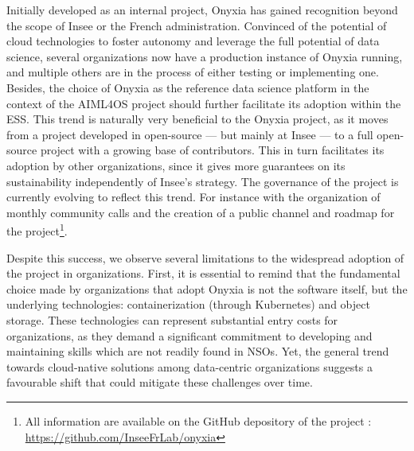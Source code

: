 \documentclass[graybox]{svmult}
\begin{document}
Initially developed as an internal project, Onyxia has gained recognition beyond the scope of Insee or the French administration. Convinced of the potential of cloud technologies to foster autonomy and leverage the full potential of data science, several organizations now have a production instance of Onyxia running, and multiple others are in the process of either testing or implementing one. Besides, the choice of Onyxia as the reference data science platform in the context of the AIML4OS project should further facilitate its adoption within the ESS. This trend is naturally very beneficial to the Onyxia project, as it moves from a project developed in open-source — but mainly at Insee — to a full open-source project with a growing base of contributors. This in turn facilitates its adoption by other organizations, since it gives more guarantees on its sustainability independently of Insee's strategy. The governance of the project is currently evolving to reflect this trend. For instance with the organization of monthly community calls and the creation of a public channel and roadmap for the project\footnote{All information are available on the GitHub depository of the project : \url{https://github.com/InseeFrLab/onyxia}}.

Despite this success, we observe several limitations to the widespread adoption of the project in organizations. First, it is essential to remind that the fundamental choice made by organizations that adopt Onyxia is not the software itself, but the underlying technologies: containerization (through Kubernetes) and object storage. These technologies can represent substantial entry costs for organizations, as they demand a significant commitment to developing and maintaining skills which are not readily found in NSOs. Yet, the general trend towards cloud-native solutions among data-centric organizations suggests a favourable shift that could mitigate these challenges over time.
\end{document}
